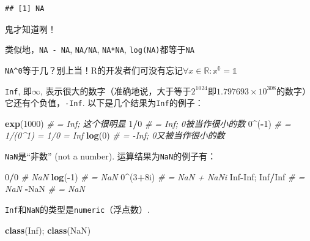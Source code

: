\documentclass[]{book}
\newenvironment{Shaded}{\begin{snugshade}}{\end{snugshade}}
\newcommand{\CommentTok}[1]{\textcolor[rgb]{0.56,0.35,0.01}{\textit{#1}}}
\newcommand{\DecValTok}[1]{\textcolor[rgb]{0.00,0.00,0.81}{#1}}
\newcommand{\KeywordTok}[1]{\textcolor[rgb]{0.13,0.29,0.53}{\textbf{#1}}}
\newcommand{\NormalTok}[1]{#1}
\newcommand{\OperatorTok}[1]{\textcolor[rgb]{0.81,0.36,0.00}{\textbf{#1}}}
\newcommand{\OtherTok}[1]{\textcolor[rgb]{0.56,0.35,0.01}{#1}}
\begin{document}
\begin{verbatim}
## [1] NA
\end{verbatim}

鬼才知道咧！

类似地，\texttt{NA\ -\ NA}, \texttt{NA/NA}, \texttt{NA*NA}, \texttt{log(NA)}都等于\texttt{NA}

\texttt{NA\^{}0}等于几？别上当！R的开发者们可没有忘记\(\forall x\in \mathbb{R:x^0 = 1}\)

\texttt{Inf}, 即\(\infty\), 表示很大的数字（准确地说，大于等于\(2^{1024}\)即\(1.797693\times10^{308}\)的数字）它还有个负值，\texttt{-Inf}. 以下是几个结果为\texttt{Inf}的例子：

\begin{Shaded}
\begin{Highlighting}[]
\KeywordTok{exp}\NormalTok{(}\DecValTok{1000}\NormalTok{) }\CommentTok{# = Inf; 这个很明显}
\DecValTok{1}\OperatorTok{/}\DecValTok{0} \CommentTok{# = Inf; 0被当作很小的数}
\DecValTok{0}\OperatorTok{^}\NormalTok{(}\OperatorTok{-}\DecValTok{1}\NormalTok{) }\CommentTok{# = 1/(0^1) = 1/0 = Inf}
\KeywordTok{log}\NormalTok{(}\DecValTok{0}\NormalTok{) }\CommentTok{# = -Inf; 0又被当作很小的数}
\end{Highlighting}
\end{Shaded}

\texttt{NaN}是``非数'' (not a number). 运算结果为\texttt{NaN}的例子有：

\begin{Shaded}
\begin{Highlighting}[]
\DecValTok{0}\OperatorTok{/}\DecValTok{0} \CommentTok{# NaN}
\KeywordTok{log}\NormalTok{(}\OperatorTok{-}\DecValTok{1}\NormalTok{) }\CommentTok{# = NaN}
\DecValTok{0}\OperatorTok{^}\NormalTok{(}\DecValTok{3}\OperatorTok{+}\NormalTok{8i) }\CommentTok{# = NaN + NaNi}
\OtherTok{Inf}\OperatorTok{-}\OtherTok{Inf}\NormalTok{; }\OtherTok{Inf}\OperatorTok{/}\OtherTok{Inf} \CommentTok{# = NaN}
\OperatorTok{-}\OtherTok{NaN} \CommentTok{# = NaN}
\end{Highlighting}
\end{Shaded}

\texttt{Inf}和\texttt{NaN}的类型是\texttt{numeric}（浮点数）.

\begin{Shaded}
\begin{Highlighting}[]
\KeywordTok{class}\NormalTok{(}\OtherTok{Inf}\NormalTok{); }\KeywordTok{class}\NormalTok{(}\OtherTok{NaN}\NormalTok{)}
\end{Highlighting}
\end{Shaded}
\end{document}

